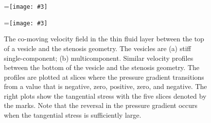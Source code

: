 \documentclass[twoside,twocolumn,9pt]{article}
\newcommand{\subfigimg}[3][,]{%
  \setbox1=\hbox{\texttt{[image: \#3]}}%
  \leavevmode\rlap{\usebox1}%
  \rlap{\hspace*{0pt}\raisebox{\dimexpr\ht1-0\baselineskip}{\bf
  \normalsize #2}}%
  \phantom{\usebox1}%
}
\begin{document}
\begin{figure}
  \centering
  \subfigimg[width=\columnwidth]{(a)}{figures/SC_top.pdf}
  \subfigimg[width=\columnwidth]{(b)}{figures/MCp5_top.pdf}
  \caption{\label{fig:BLvelocities} \small The co-moving velocity field
  in the thin fluid layer between the top of a vesicle and the stenosis
  geometry. The vesicles are (a) stiff single-component; (b)
  multicomponent. Similar velocity profiles between the bottom of the
  vesicle and the stenosis geometry. The profiles are plotted at slices
  where the pressure gradient transitions from a value that is negative,
  zero, positive, zero, and negative. The right plots show the
  tangential stress with the five slices denoted by the marks. Note that
  the reversal in the pressure gradient occurs when the tangential
  stress is sufficiently large.}
\end{figure}


\end{document}
